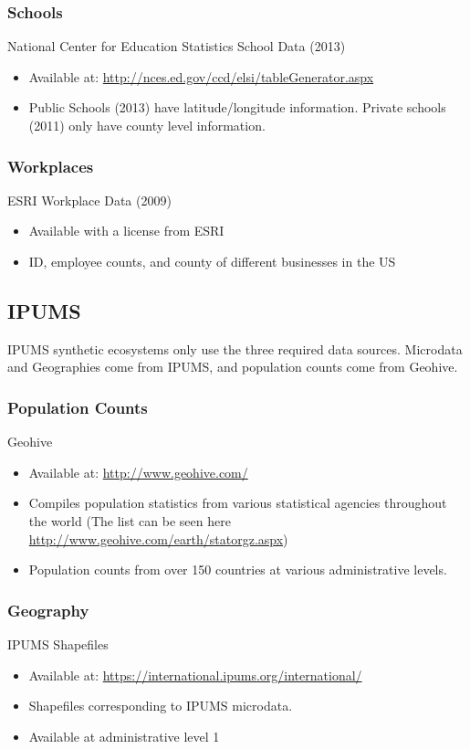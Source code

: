 \documentclass{article}
\begin{document}
\subsubsection{Schools}
National Center for Education Statistics School Data (2013) \cite{elsi2015}
\begin{itemize}
	\item Available at: \url{http://nces.ed.gov/ccd/elsi/tableGenerator.aspx}
	\item Public Schools (2013) have latitude/longitude information. Private schools (2011) only have county level information. 
\end{itemize}

\subsubsection{Workplaces}		
ESRI Workplace Data (2009) \cite{esriBusiness}
\begin{itemize}
	\item Available with a license from ESRI
	\item ID, employee counts, and county of different businesses in the US
\end{itemize}

\subsection{IPUMS}
IPUMS synthetic ecosystems only use the three required data sources. Microdata and Geographies come from IPUMS, and population counts come from Geohive.

\subsubsection{Population Counts}
Geohive \cite{geohive}
\begin{itemize}
	\item Available at: \url{http://www.geohive.com/}
	\item Compiles population statistics from various statistical agencies throughout the world (The list can be seen here \url{http://www.geohive.com/earth/statorgz.aspx})
	\item Population counts from over 150 countries at various administrative levels. 
\end{itemize}

\subsubsection{Geography}
IPUMS Shapefiles \cite{ipumsi}
\begin{itemize}
	\item Available at: \url{https://international.ipums.org/international/}
	\item Shapefiles corresponding to IPUMS microdata. 
	\item Available at administrative level 1 
\end{itemize}
\end{document}
